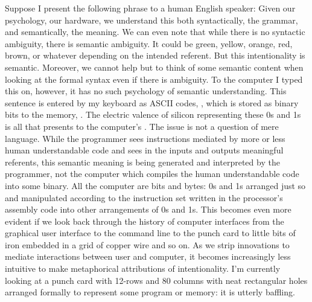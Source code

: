 \documentclass[letterpaper,notitlepage,12pt]{article}
\begin{document}
Suppose I present the following phrase to a human English speaker: 
 Given our 
psychology, our hardware,  we understand this both syntactically, the grammar, 
and semantically, the meaning.
We can even note that while there is no syntactic ambiguity, there is semantic
ambiguity.
It could be green, yellow, orange, red, brown, or whatever depending on the
intended referent.
But this intentionality is semantic.
Moreover, we cannot help but to think of some semantic content when looking at
the formal syntax even if there is ambiguity.
To the computer I typed this on, however, it has no such psychology of semantic
understanding.
This sentence is entered by my keyboard as ASCII codes, , which is stored as binary bits to the memory,
.
The electric valence of silicon representing these 0s and 1s is all that
presents to the computer's .
The issue is not a question of mere language.
While the programmer sees instructions mediated by more or less human
understandable code and sees in the inputs and outputs meaningful referents,
this semantic meaning is being generated and interpreted by the programmer, not
the computer which compiles the human understandable code into some binary.
All the computer  are bits and bytes: 0s and 1s arranged just so
and manipulated according to the instruction set written in the processor's
assembly code into other arrangements of 0s and 1s.
This becomes even more evident if we look back through the history of computer
interfaces from the graphical user interface to the command line to the punch
card to little bits of iron embedded in a grid of copper wire and so on.
As we strip innovations to mediate interactions between user and computer, it
becomes increasingly less intuitive to make metaphorical attributions of
intentionality.
I'm currently looking at a punch card with 12-rows and 80 columns with neat
rectangular holes arranged formally to represent some program or memory: it is
utterly baffling.
\end{document}
